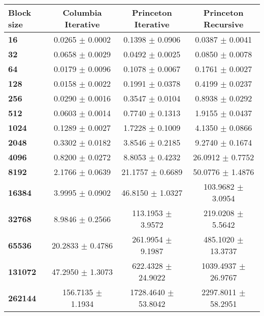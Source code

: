 \begin{tabular}{lccc}\toprule
\textbf{Block size}  & \textbf{Columbia Iterative} & \textbf{Princeton Iterative} & \textbf{Princeton Recursive}\\\midrule
\textbf{16}  & 0.0265 $\pm$ 0.0002 & 0.1398 $\pm$ 0.0906 & 0.0387 $\pm$ 0.0041\\
\textbf{32}  & 0.0658 $\pm$ 0.0029 & 0.0492 $\pm$ 0.0025 & 0.0850 $\pm$ 0.0078\\
\textbf{64}  & 0.0179 $\pm$ 0.0096 & 0.1078 $\pm$ 0.0067 & 0.1761 $\pm$ 0.0027\\
\textbf{128}  & 0.0158 $\pm$ 0.0022 & 0.1991 $\pm$ 0.0378 & 0.4199 $\pm$ 0.0237\\
\textbf{256}  & 0.0290 $\pm$ 0.0016 & 0.3547 $\pm$ 0.0104 & 0.8938 $\pm$ 0.0292\\
\textbf{512}  & 0.0603 $\pm$ 0.0014 & 0.7740 $\pm$ 0.1313 & 1.9155 $\pm$ 0.0437\\
\textbf{1024}  & 0.1289 $\pm$ 0.0027 & 1.7228 $\pm$ 0.1009 & 4.1350 $\pm$ 0.0866\\
\textbf{2048}  & 0.3302 $\pm$ 0.0182 & 3.8546 $\pm$ 0.2185 & 9.2740 $\pm$ 0.1674\\
\textbf{4096}  & 0.8200 $\pm$ 0.0272 & 8.8053 $\pm$ 0.4232 & 26.0912 $\pm$ 0.7752\\
\textbf{8192}  & 2.1766 $\pm$ 0.0639 & 21.1757 $\pm$ 0.6689 & 50.0776 $\pm$ 1.4876\\
\textbf{16384}  & 3.9995 $\pm$ 0.0902 & 46.8150 $\pm$ 1.0327 & 103.9682 $\pm$ 3.0954\\
\textbf{32768}  & 8.9846 $\pm$ 0.2566 & 113.1953 $\pm$ 3.9572 & 219.0208 $\pm$ 5.5642\\
\textbf{65536}  & 20.2833 $\pm$ 0.4786 & 261.9954 $\pm$ 9.1987 & 485.1020 $\pm$ 13.3737\\
\textbf{131072}  & 47.2950 $\pm$ 1.3073 & 622.4328 $\pm$ 24.9022 & 1039.4937 $\pm$ 26.9767\\
\textbf{262144} & 156.7135 $\pm$ 1.1934 & 1728.4640 $\pm$ 53.8042 & 2297.8011 $\pm$ 58.2951\\
\bottomrule
\end{tabular}
